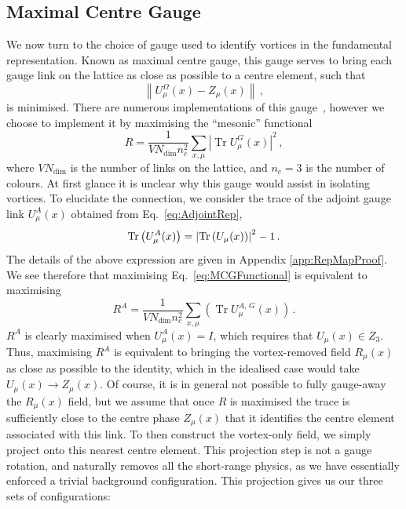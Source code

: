 \subsection{Maximal Centre Gauge}\label{sec:MCG}
We now turn to the choice of gauge used to identify vortices in the fundamental representation. Known as maximal centre gauge, this gauge serves to bring each gauge link on the lattice as close as possible to a centre element, such that
%
\begin{equation}
\left\| U _ { \mu } ^ { \Omega } ( x ) - Z _ { \mu } ( x ) \right\|\, ,
\end{equation}
%
is minimised. There are numerous implementations of this gauge~\cite{Montero:1999by,Faber:1999sq}, however we choose to implement it by maximising the ``mesonic'' functional~\cite{Langfeld:2003ev}
%
\begin{equation}
R = \frac { 1 } { V N _ { \operatorname { dim } } n _ { c } ^ { 2 } } \sum _ { x , \mu } \left| \operatorname { Tr } U _ { \mu } ^ { G } ( x ) \right| ^ { 2 }\, ,
\label{eq:MCGFunctional}
\end{equation} 
%
where $VN _ { \operatorname { dim } }$ is the number of links on the lattice, and $n_c=3$ is the number of colours. At first glance it is unclear why this gauge would assist in isolating vortices. To elucidate the connection, we consider the trace of the adjoint gauge link $U^A_\mu(x)$ obtained from Eq.~\ref{eq:AdjointRep},
%
\begin{equation}
\operatorname{Tr}\left(U^A_\mu(x)\right) = \left|\operatorname{Tr}\left(U_\mu(x)\right)\right|^2 - 1\, .
\end{equation}
%
The details of the above expression are given in Appendix \ref{app:RepMapProof}. We see therefore that maximising Eq.~\ref{eq:MCGFunctional} is equivalent to maximising
%
\begin{equation}
R^A = \frac { 1 } { V N _ { \operatorname { dim } } n _ { c } ^ { 2 } } \sum _ { x , \mu } \left( \operatorname { Tr } U _ { \mu } ^ { A,\,G } ( x ) \right)\, .
\end{equation}
%
$R^A$ is clearly maximised when $U_\mu^A(x)=I$, which requires that $U_\mu(x) \in Z_3$. Thus, maximising $R^A$ is equivalent to bringing the vortex-removed field $R_\mu(x)$ as close as possible to the identity, which in the idealised case would take $U_\mu(x)\rightarrow Z_\mu(x)$. Of course, it is in general not possible to fully gauge-away the $R_\mu(x)$ field, but we assume that once $R$ is maximised the trace is sufficiently close to the centre phase $Z_\mu(x)$ that it identifies the centre element associated with this link. To then construct the vortex-only field, we simply project onto this nearest centre element. This projection step is not a gauge rotation, and naturally removes all the short-range physics, as we have essentially enforced a trivial background configuration. This projection gives us our three sets of configurations:
